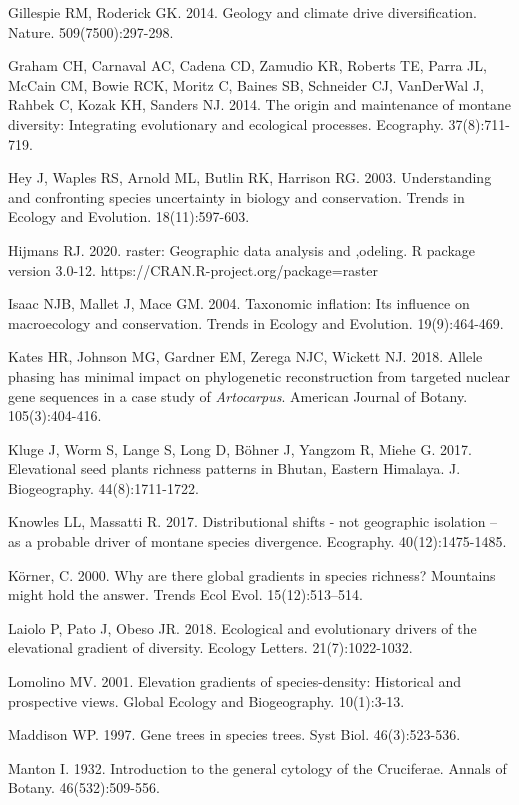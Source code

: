 Gillespie RM, Roderick GK. 2014. Geology and climate drive diversification. Nature. 509(7500):297-298.

Graham CH, Carnaval AC, Cadena CD, Zamudio KR, Roberts TE, Parra JL, McCain CM, Bowie RCK, Moritz C, Baines SB, Schneider CJ, VanDerWal J, Rahbek C, Kozak KH, Sanders NJ. 2014. The origin and maintenance of montane diversity: Integrating evolutionary and ecological processes. Ecography. 37(8):711-719.

Hey J, Waples RS, Arnold ML, Butlin RK, Harrison RG. 2003. Understanding and confronting species uncertainty in biology and conservation. Trends in Ecology and Evolution. 18(11):597-603.

Hijmans RJ. 2020. raster: Geographic data analysis and ,odeling. R package version 3.0-12. https://CRAN.R-project.org/package=raster

Isaac NJB, Mallet J, Mace GM. 2004. Taxonomic inflation: Its influence on macroecology and conservation. Trends in Ecology and Evolution. 19(9):464-469.

Kates HR, Johnson MG, Gardner EM, Zerega NJC, Wickett NJ. 2018. Allele phasing has minimal impact on phylogenetic reconstruction from targeted nuclear gene sequences in a case study of \textit{Artocarpus}. American Journal of Botany. 105(3):404-416.

Kluge J, Worm S, Lange S, Long D, Böhner J, Yangzom R, Miehe G. 2017. Elevational seed plants richness patterns in Bhutan, Eastern Himalaya. J. Biogeography. 44(8):1711-1722.

Knowles LL, Massatti R. 2017. Distributional shifts - not geographic isolation – as a probable driver of montane species divergence. Ecography. 40(12):1475-1485.

Körner, C. 2000. Why are there global gradients in species richness? Mountains might hold the answer. Trends Ecol Evol. 15(12):513–514.

Laiolo P, Pato J, Obeso JR. 2018. Ecological and evolutionary drivers of the elevational gradient of diversity. Ecology Letters. 21(7):1022-1032.

Lomolino MV. 2001. Elevation gradients of species-density: Historical and prospective views. Global Ecology and Biogeography. 10(1):3-13.

Maddison WP. 1997. Gene trees in species trees. Syst Biol. 46(3):523-536.

Manton I. 1932. Introduction to the general cytology of the Cruciferae. Annals of Botany. 46(532):509-556.

